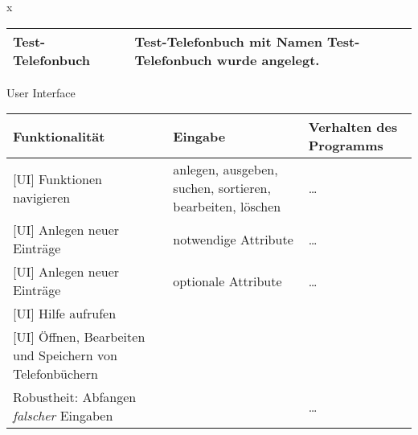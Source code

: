 \documentclass[a4paper]{article}
\begin{document}
\begin{exercise}{x}
\begin{center}
\begin{tabular}{| p{2.5cm} | p{2.2cm} | p{10cm} |}
		Test-Telefonbuch &
		& Test-Telefonbuch mit Namen Test-Telefonbuch wurde angelegt. \\ \hline
	\end{tabular}
	
	\newpage
	
	{\Large User Interface} \\[2ex]
		
	\begin{tabular}{| p{2.5cm} | p{2.2cm} | p{10cm} |}
		\hline
		Funktionalit\"at & Eingabe & Verhalten des Programms\\ \hline \hline
				
		[UI] Funktionen navigieren & anlegen, ausgeben, suchen, sortieren, bearbeiten, l\"oschen
		& \dots \\ \hline
		
		[UI] Anlegen neuer Eintr\"age & notwendige Attribute
		& \dots \\ \hline
		
		[UI] Anlegen neuer Eintr\"age & optionale Attribute
		& \dots \\ \hline
		
		[UI] Hilfe aufrufen & 
		&  \\ \hline
		
		[UI] \"Offnen, Bearbeiten und Speichern von Telefonb\"uchern & 
		& \\ \hline
	
		Robustheit: Abfangen \emph{falscher} Eingaben &
		& \dots\\ \hline
				
		
	\end{tabular}
\end{center}

\end{exercise}


\end{document}
